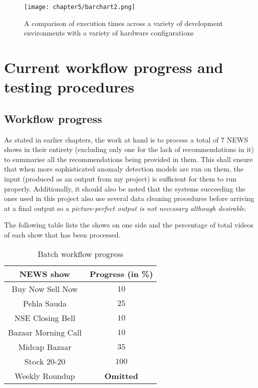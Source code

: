 \begin{figure}[h]
  \centering
  \texttt{[image: chapter5/barchart2.png]}
  \caption{A comparison of execution times across a variety of development environments with a variety of hardware configurations}
  \label{fig:hardware}
\end{figure}

\section{Current workflow progress and testing procedures}

\subsection{Workflow progress}

As stated in earlier chapters, the work at hand is to process a total of $7$ NEWS shows in their entirety (excluding only one for the lack of recommendations in it) to summarise all the recommendations being provided in them. This shall ensure that when more sophisticated anomaly detection models are run on them, the input (produced as an output from my project) is sufficient for them to run properly. Additionally, it should also be noted that the systems succeeding the ones used in this project also use several data cleaning procedures before arriving at a final output so a \textit{picture-perfect output is not necessary although desirable}. \par

The following table lists the shows on one side and the percentage of total videos of each show that has been processed.

\begin{table}[h]
 \def\arraystretch{1.5}
 \centering
 \caption{Batch workflow progress}
 \begin{tabular}{|c|c|}
  \hline
  NEWS show & Progress (in \%)\\
  \hline
  Buy Now Sell Now & $10$                   \\
  \hline
  Pehla Sauda & $25$                   \\
  \hline
  NSE Closing Bell & $10$                   \\
  \hline
  Bazaar Morning Call & $10$                   \\
  \hline
  Midcap Bazaar & $35$                 \\
  \hline
  Stock 20-20 & $100$                \\
  \hline
  Weekly Roundup & \textbf{Omitted}               \\
  \hline
 \end{tabular}
 \label{tab:news_prog}
\end{table}


